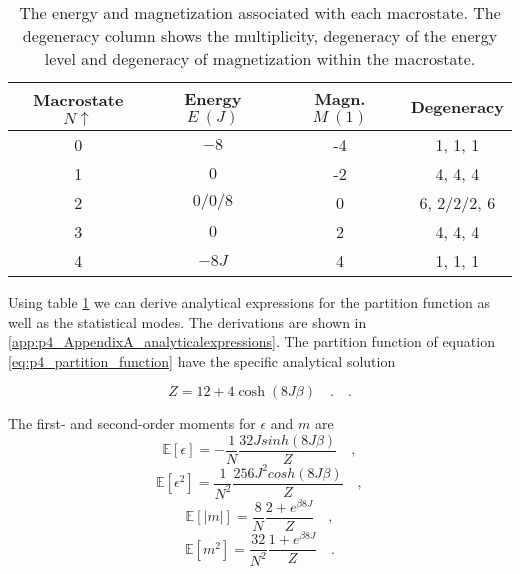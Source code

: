 \documentclass[../main_proj4_correct_template.tex]{subfiles}
\begin{document}
\begin{table}[h!]
    \centering
    \caption{The energy and magnetization associated with each macrostate. The degeneracy column shows the multiplicity, degeneracy of the energy level and degeneracy of magnetization within the macrostate.}
    \begin{tabular}{cccc}
    \toprule
    Macrostate $N\uparrow$ & Energy $E~(J)$  & Magn. $M~(1)$ & Degeneracy\\ \midrule
    0  & $-8$ & -4 & 1, 1, 1 \\
    1  & $0$  & -2 & 4, 4, 4\\
    2  & $0/0/8$ & 0 & 6, 2/2/2, 6\\
    3  & $0$  & 2  & 4, 4, 4 \\
    4  & $-8J$ & 4  & 1, 1, 1\\ \bottomrule
    \end{tabular}
    
    \label{tab:p4_2x2lattice}
\end{table}

Using table \ref{tab:p4_2x2lattice} we can derive analytical expressions for the partition function as well as the statistical modes. The derivations are shown in \ref{app:p4_AppendixA_analyticalexpressions}. The partition function of equation \eqref{eq:p4_partition_function} have the specific analytical solution 

\begin{equation}
\label{eq:p4_partition_function_2x2analytical}
    Z = 12 + 4\cosh(8J\beta) \quad.
\quad.
\end{equation}

\noindent The first- and second-order moments for $\epsilon$ and $m$ are 
\begin{equation}
\label{eq:p4_<eps>}
    \mathbb{E}[\epsilon] = - \frac{1}{N}\frac{32Jsinh(8J\beta)}{Z} \quad,
\end{equation}
\begin{equation}
\label{eq:p4_<eps2>}
    \mathbb{E}[\epsilon^{2}] = \frac{1}{N^{2}}\frac{256 J^{2} cosh(8J\beta)}{Z} \quad,
\end{equation}
\begin{equation}
\label{eq:p4_<|m|>}
    \mathbb{E}[|m|]= \frac{8}{N} \frac{2+e^{\beta 8 J}}{Z} \quad,
\end{equation}
\begin{equation}
\label{eq:p4_<m2>}
    \mathbb{E}[m^{2}] = \frac{32}{N^{2}} \frac{1+ e^{\beta 8J}}{Z} \quad.
\end{equation}
\end{document}
